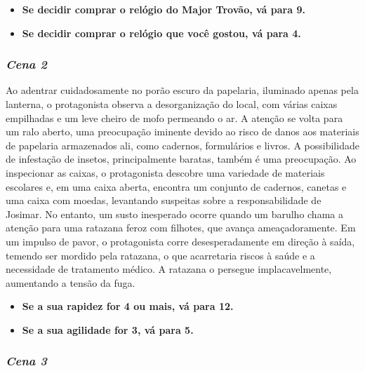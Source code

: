 \newpage

\begin{itemize}
	\item \textbf{Se decidir comprar o relógio do Major Trovão, vá para 9.}
	\item \textbf{Se decidir comprar o relógio que você gostou, vá para 4.}
\end{itemize}

\bigskip\medskip

\subsubsection*{\textit{\textbf{Cena 2}}}

Ao adentrar cuidadosamente no porão escuro da papelaria, iluminado apenas pela lanterna, o protagonista observa a desorganização do local, com várias caixas empilhadas e um leve cheiro de mofo permeando o ar. A atenção se volta para um ralo aberto, uma preocupação iminente devido ao risco de danos aos materiais de papelaria armazenados ali, como cadernos, formulários e livros. A possibilidade de infestação de insetos, principalmente baratas, também é uma preocupação. Ao inspecionar as caixas, o protagonista descobre uma variedade de materiais escolares e, em uma caixa aberta, encontra um conjunto de cadernos, canetas e uma caixa com moedas, levantando suspeitas sobre a responsabilidade de Josimar. No entanto, um susto inesperado ocorre quando um barulho chama a atenção para uma ratazana feroz com filhotes, que avança ameaçadoramente. Em um impulso de pavor, o protagonista corre desesperadamente em direção à saída, temendo ser mordido pela ratazana, o que acarretaria riscos à saúde e a necessidade de tratamento médico. A ratazana o persegue implacavelmente, aumentando a tensão da fuga.

\begin{itemize}
	\item \textbf{Se a sua rapidez for 4 ou mais, vá para 12.}
	\item \textbf{Se a sua agilidade for 3, vá para 5.}
\end{itemize}

\bigskip\medskip

\subsubsection*{\textit{\textbf{Cena 3}}}

